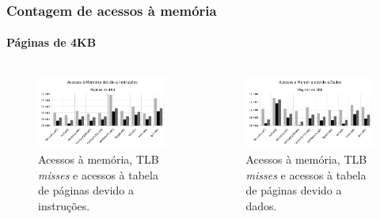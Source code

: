 \documentclass[10pt]{beamer}
\begin{document}
\begin{frame}
\frametitle{Contagem de acessos à memória}
\framesubtitle{Páginas de 4KB}

\begin{columns}

\begin{figure}[h!]
\centering
\centering

\includegraphics[width=0.9\linewidth]{inst_4KBs}
\caption{Acessos à memória, TLB \textit{misses} e acessos à tabela de páginas
devido a instruções.}
\end{figure}

\begin{figure}[h!]
\centering
\centering

\includegraphics[width=0.9\linewidth]{data_4KBs}
\caption{Acessos à memória, TLB \textit{misses} e acessos à tabela de páginas
devido a dados.}
\end{figure}
\end{columns}

\end{frame}
\end{document}
